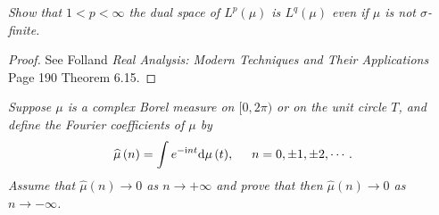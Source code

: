 \begin{problem}\em
Show that $1<p<\infty$ the dual space of $L^p(\mu)$ is $L^q(\mu)$ even if $\mu$ is not $\sigma$-finite.
\end{problem}
\begin{proof}
See Folland \textit{Real Analysis: Modern Techniques and Their Applications} Page 190 Theorem 6.15.
\end{proof}
\begin{problem}\em
Suppose $\mu$ is a complex Borel measure on $[0,2\pi)$ or on the unit circle $T$, and define the Fourier coefficients of $\mu$ by 
$$
\widehat{\mu }\left( n \right) =\int{e^{-\mathrm{i}nt}\mathrm{d}\mu \left( t \right)},\hspace{0.5cm}n=0,\pm 1,\pm 2,\cdots .
$$
Assume that $\widehat{\mu}(n)\to 0$ as $n\to+\infty$ and prove that then $\widehat{\mu}(n)\to 0$ as $n\to-\infty$.
\end{problem}
